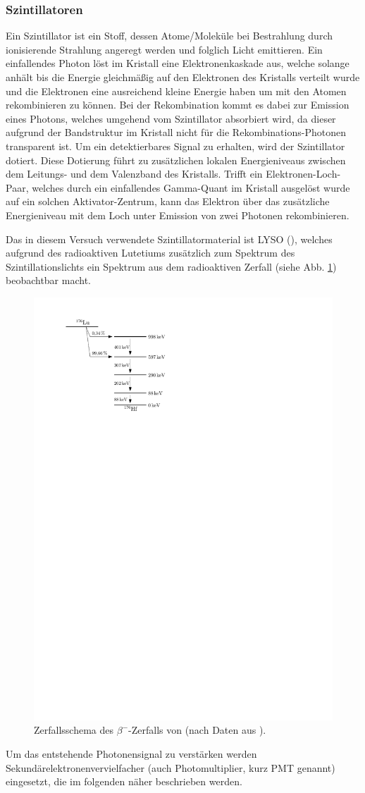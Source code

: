 \documentclass[11pt, a4paper]{article}
\numberwithin{equation}{section}
\begin{document}
\subsubsection{Szintillatoren}

Ein Szintillator ist ein Stoff, dessen Atome/Moleküle bei Bestrahlung durch ionisierende Strahlung angeregt werden und folglich Licht emittieren.
Ein einfallendes Photon löst im Kristall eine Elektronenkaskade aus, welche solange anhält bis die Energie gleichmäßig auf den Elektronen des Kristalls verteilt wurde und die Elektronen eine ausreichend kleine Energie haben um mit den Atomen rekombinieren zu können.
Bei der Rekombination kommt es dabei zur Emission eines Photons, welches umgehend vom Szintillator absorbiert wird, da dieser aufgrund der Bandstruktur im Kristall nicht für die Rekombinations-Photonen transparent ist.
Um ein detektierbares Signal zu erhalten, wird der Szintillator dotiert.
Diese Dotierung führt zu zusätzlichen lokalen Energieniveaus zwischen dem Leitungs- und dem Valenzband des Kristalls.
Trifft ein Elektronen-Loch-Paar, welches durch ein einfallendes Gamma-Quant im Kristall ausgelöst wurde auf ein solchen Aktivator-Zentrum, kann das Elektron über das zusätzliche Energieniveau mit dem Loch unter Emission von zwei Photonen rekombinieren.

Das in diesem Versuch verwendete Szintillator\-material ist LYSO (), welches aufgrund des radioaktiven Lute\-tiums zusätzlich zum Spektrum des Szin\-tillations\-lichts ein Spektrum aus dem radioaktiven Zerfall (siehe Abb. \ref{fig:lu_decay_scheme}) beobachtbar macht.
\begin{figure}[htbp]
	\centering
	\includegraphics[width=.5\textwidth]{./figures/lu_decay_scheme}
	\caption{Zerfallsschema des $\beta^-$-Zerfalls von  (nach Daten aus \cite{nuc_datasheet_lu}).}
	\label{fig:lu_decay_scheme}
\end{figure}
Um das entstehende Photonensignal zu verstärken werden Sekundärelektronenvervielfacher (auch Photomultiplier, kurz PMT genannt) eingesetzt, die im folgenden näher beschrieben werden.
\end{document}
